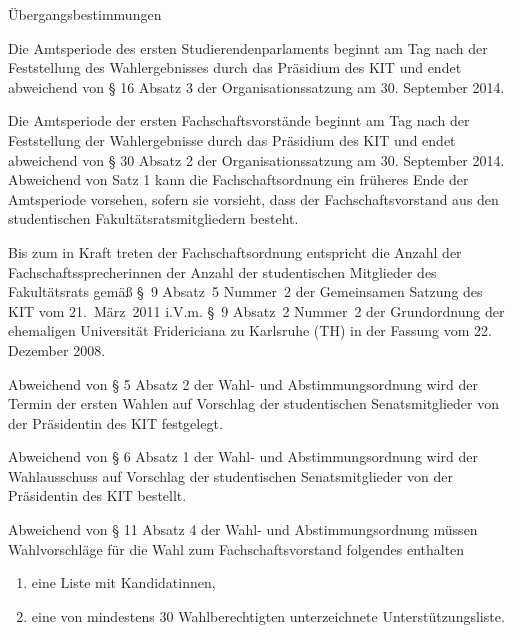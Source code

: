 
\begin{jurdoc}{Übergangsbestimmungen}

\label{amtsperiode}
Die Amtsperiode des ersten Studierendenparlaments beginnt am Tag nach der Feststellung des Wahlergebnisses durch das Präsidium des KIT und endet abweichend von § 16 Absatz 3 der Organisationssatzung am 30. September 2014.

Die Amtsperiode der ersten Fachschaftsvorstände beginnt am Tag nach der Feststellung der Wahlergebnisse durch das Präsidium des KIT und endet abweichend von § 30 Absatz 2 der Organisationssatzung am 30. September 2014. Abweichend von Satz 1 kann die Fachschaftsordnung ein früheres Ende der Amtsperiode vorsehen, sofern sie vorsieht, dass der Fachschaftsvorstand aus den studentischen Fakultätsratsmitgliedern besteht.


\label{fachschaftssprecher}

Bis zum in Kraft treten der Fachschaftsordnung entspricht die Anzahl der Fachschaftssprecherinnen der Anzahl der studentischen Mitglieder des Fakultätsrats gemäß §~9 Absatz~5 Nummer~2 der Gemeinsamen Satzung des KIT vom 21.~März~2011 i.V.m. §~9 Absatz~2 Nummer~2 der Grundordnung der ehemaligen Universität Fridericiana zu Karlsruhe (TH) in der Fassung vom 22. Dezember 2008.


\label{wahlen}

Abweichend  von § 5 Absatz 2 der Wahl- und Abstimmungsordnung wird der Termin der ersten Wahlen auf Vorschlag der studentischen Senatsmitglieder von der Präsidentin des KIT festgelegt.

Abweichend von § 6 Absatz 1 der Wahl- und Abstimmungsordnung wird der Wahlausschuss auf Vorschlag der studentischen Senatsmitglieder von der Präsidentin des KIT bestellt.

Abweichend von § 11 Absatz 4 der Wahl- und Abstimmungsordnung müssen Wahlvorschläge für die Wahl zum Fachschaftsvorstand folgendes enthalten
\begin{enumerate}
\item eine Liste mit Kandidatinnen,
\item eine von mindestens 30 Wahlberechtigten unterzeichnete Unterstützungsliste.
\end{enumerate}


\end{jurdoc}
